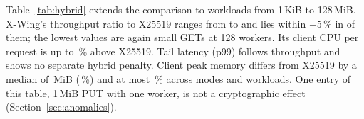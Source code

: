 \documentclass[conference]{IEEEtran}
\newcommand{\lab}[1]{\textsf{#1}}
\begin{document}
\begin{table}[t]
\caption{Hybrid modes in the primary cells: paired throughput ratio and unadjusted TOST verdict at $\pm$5\,\% (exploratory). P3 = X-Wing, P2 = concatenation hybrid.}
\label{tab:secondary}
\centering\footnotesize
\setlength{\tabcolsep}{3pt}
\resizebox{\columnwidth}{!}{}
\end{table}

Table~\ref{tab:hybrid} extends the comparison to \RevMatrixCells{} workloads
from 1\,KiB to 128\,MiB. X-Wing's throughput ratio to X25519 ranges from \RevMatrixXwingLo{} to
\RevMatrixXwingHi{} and lies within $\pm$5\,\% in \RevMatrixXwingWithin{} of them; the lowest
values are again small GETs at 128 workers. Its client CPU per request is up to
\RevMatrixXwingCpuHi\,\% above X25519. Tail latency (p99) follows throughput and shows no
separate hybrid penalty. Client peak memory differs from X25519 by a median of
\RevHybridRssDiffMedian\,MiB (\RevHybridRssDiffMedianPct\,\%) and at most
\RevHybridRssDiffMaxPct\,\% across modes and workloads. One entry of this table, 1\,MiB PUT with
one worker, is not a cryptographic effect (Section~\ref{sec:anomalies}).

\begin{table}[t]
\caption{\lab{Hybrid-Matrix} (64\,KiB at 128 workers from \lab{Primary-x86}): X25519 in absolute terms and paired ratios of ML-KEM-768 (P1), the concatenation hybrid (P2) and X-Wing (P3) to it. $^{*}$ = the 95\,\% interval of the ratio excludes 1 (unadjusted, five runs; ten in \lab{Primary-x86}). Of the \RevMatrixTests{} ratios, \RevMatrixRawSig{} are marked; \RevMatrixFdrSig{} remain at a false-discovery rate of 5\,\% (Benjamini--Hochberg), so individual marks should not be over-read.}
\label{tab:hybrid}
\centering\footnotesize
\setlength{\tabcolsep}{4pt}

\end{table}
\end{document}
